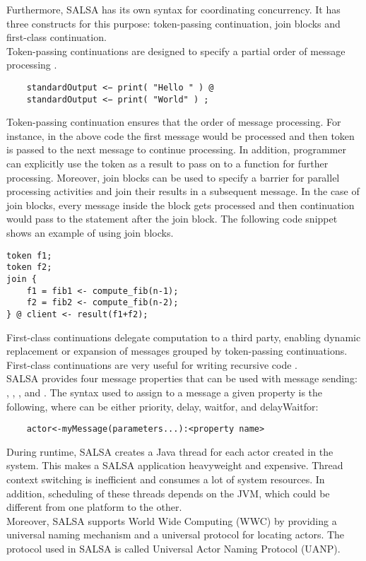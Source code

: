 Furthermore, SALSA has its own syntax for coordinating concurrency. It has three constructs for this purpose: token-passing continuation, join blocks and first-class continuation.\\
Token-passing continuations are designed to specify a partial order of message processing \cite{SALSA_Man}.
\begin{verbatim}
    standardOutput <− print( "Hello " ) @
    standardOutput <− print( "World" ) ;
\end{verbatim}
Token-passing continuation ensures that the order of message processing. For instance, in the above code the first message would be processed and then token is passed to the next message to continue processing. In addition, programmer can explicitly use the token as a result to pass on to a function for further processing. 
Moreover, join blocks can be used to specify a barrier for parallel processing activities and join their results in a subsequent message. In the case of join blocks, every message inside the block gets processed and then continuation would pass to the statement after the join block. The following code snippet shows an example of using join blocks.
\begin{verbatim}
token f1;
token f2;
join {
    f1 = fib1 <- compute_fib(n-1);
    f2 = fib2 <- compute_fib(n-2);
} @ client <- result(f1+f2);
\end{verbatim}
First-class continuations delegate computation to a third party, enabling dynamic replacement or expansion of messages grouped by token-passing continuations. First-class continuations are very useful for writing recursive code \cite{SALSA_Man}.\\
SALSA provides four message properties that can be used with message sending: , , , and . The syntax used to assign to a message a given property is the following, where  can be either priority, delay, waitfor, and delayWaitfor: 
\begin{verbatim}
    actor<-myMessage(parameters...):<property name>
\end{verbatim}
During runtime, SALSA creates a Java thread for each actor created in the system. This makes a SALSA application heavyweight and expensive. Thread context switching is inefficient and consumes a lot of system resources. In addition, scheduling of these threads depends on the JVM, which could be different from one platform to the other.\\
Moreover, SALSA supports World Wide Computing (WWC) by providing a universal naming mechanism and a universal protocol for locating actors. The protocol used in SALSA is called Universal Actor Naming Protocol (UANP). 

